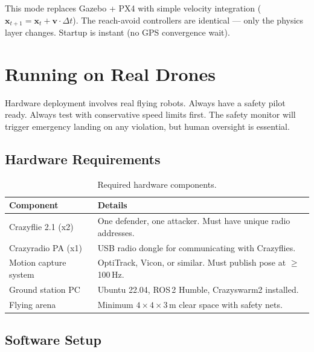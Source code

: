 \documentclass[11pt,a4paper]{article}
\begin{document}
This mode replaces Gazebo + PX4 with simple velocity integration ($\mathbf{x}_{t+1} = \mathbf{x}_t + \mathbf{v} \cdot \Delta t$). The reach-avoid controllers are identical --- only the physics layer changes. Startup is instant (no GPS convergence wait).


\section{Running on Real Drones}

\begin{dangerbox}
Hardware deployment involves real flying robots. Always have a safety pilot ready. Always test with conservative speed limits first. The safety monitor will trigger emergency landing on any violation, but human oversight is essential.
\end{dangerbox}

\subsection{Hardware Requirements}

\begin{table}[h]
\centering
\caption{Required hardware components.}
\begin{tabular}{lp{8cm}}
\toprule
\textbf{Component} & \textbf{Details} \\
\midrule
Crazyflie 2.1 (x2) & One defender, one attacker. Must have unique radio addresses. \\
Crazyradio PA (x1) & USB radio dongle for communicating with Crazyflies. \\
Motion capture system & OptiTrack, Vicon, or similar. Must publish pose at $\geq$100\,Hz. \\
Ground station PC & Ubuntu 22.04, ROS\,2 Humble, Crazyswarm2 installed. \\
Flying arena & Minimum $4 \times 4 \times 3$\,m clear space with safety nets. \\
\bottomrule
\end{tabular}
\end{table}

\subsection{Software Setup}
\end{document}
